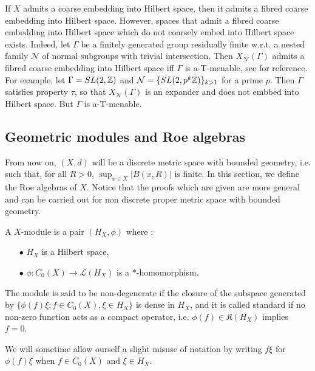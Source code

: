 \begin{rk} If $X$ admits a coarse embedding into Hilbert space, then it admits a fibred coarse embedding into Hilbert space. However, spaces that admit a fibred coarse embedding into Hilbert space which do not coarsely embed into Hilbert space exists. Indeed, let $\Gamma$ be a finitely generated group residually finite w.r.t. a nested family $\mathcal N$ of normal subgroups with trivial intersection. Then $X_{\mathcal N}(\Gamma)$ admits a fibred coarse embedding into Hilbert space iff $\Gamma$ is a-T-menable, see \cite{FinnSellFibred} for reference. For example, let $\Gamma = SL(2,\mathbb Z)$ and $\mathcal N= \{SL(2,p^k\mathbb Z)\}_{k>1}$ for a prime $p$. Then $\Gamma$ satisfies property $\tau$, so that $X_{\mathcal N}(\Gamma)$ is an expander and does not embbed into Hilbert space. But $\Gamma$ is a-T-menable.
\end{rk}


\subsection{Geometric modules and Roe algebras}

From now on, $(X,d)$ will be a discrete metric space with bounded geometry, i.e. such that, for all $R>0$, $\sup_{x\in X} |B(x,R)|$ is finite. In this section, we define the Roe algebras of $X$. Notice that the proofs which are given are more general and can be carried out for non discrete proper metric space with bounded geometry. \\  

\begin{definition} A $X$-module is a pair $(H_X,\phi)$ where :
\begin{itemize}
\item[$\bullet$] $H_X$ is a Hilbert space,
\item[$\bullet$] $\phi : C_0(X)\rightarrow \mathcal L(H_X)$ is a $*$-homomorphism. 
\end{itemize}
The module is said to be non-degenerate if the closure of the subspace generated by $\{\phi(f)\xi : f\in C_0(X), \xi\in H_X\}$ is dense in $H_X$, and it is called standard if no non-zero function acts as a compact operator, i.e. $\phi(f) \in\mathfrak K(H_X)$ implies $f=0$.
\end{definition}

We will sometime allow ourself a slight misuse of notation by writing $f\xi$ for $\phi(f)\xi$ when $f\in C_0(X)$ and $\xi \in H_X$.

